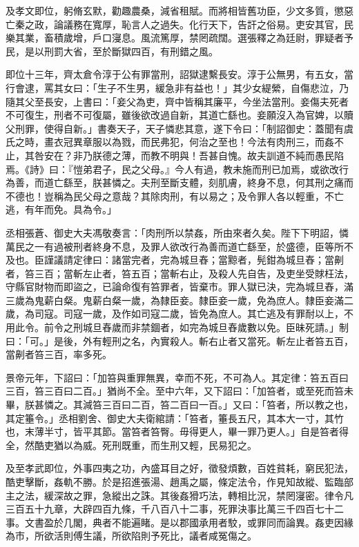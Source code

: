 \begin{pinyinscope}
及孝文即位，躬脩玄默，勸趣農桑，減省租賦。而將相皆舊功臣，少文多質，懲惡亡秦之政，論議務在寬厚，恥言人之過失。化行天下，告訐之俗易。吏安其官，民樂其業，畜積歲增，戶口寖息。風流篤厚，禁罔疏闊。選張釋之為廷尉，罪疑者予民，是以刑罰大省，至於斷獄四百，有刑錯之風。

即位十三年，齊太倉令淳于公有罪當刑，詔獄逮繫長安。淳于公無男，有五女，當行會逮，罵其女曰：「生子不生男，緩急非有益也！」其少女緹縈，自傷悲泣，乃隨其父至長安，上書曰：「妾父為吏，齊中皆稱其廉平，今坐法當刑。妾傷夫死者不可復生，刑者不可復屬，雖後欲改過自新，其道亡繇也。妾願沒入為官婢，以贖父刑罪，使得自新。」書奏天子，天子憐悲其意，遂下令曰：「制詔御史：蓋聞有虞氏之時，畫衣冠異章服以為戮，而民弗犯，何治之至也！今法有肉刑三，而姦不止，其咎安在？非乃朕德之薄，而教不明與！吾甚自愧。故夫訓道不純而愚民陷焉。《詩》曰：『愷弟君子，民之父母。』今人有過，教未施而刑已加焉，或欲改行為善，而道亡繇至，朕甚憐之。夫刑至斷支體，刻肌膚，終身不息，何其刑之痛而不德也！豈稱為民父母之意哉？其除肉刑，有以易之；及令罪人各以輕重，不亡逃，有年而免。具為令。」

丞相張蒼、御史大夫馮敬奏言：「肉刑所以禁姦，所由來者久矣。陛下下明詔，憐萬民之一有過被刑者終身不息，及罪人欲改行為善而道亡繇至，於盛德，臣等所不及也。臣謹議請定律曰：諸當完者，完為城旦舂；當黥者，髡鉗為城旦舂；當劓者，笞三百；當斬左止者，笞五百；當斬右止，及殺人先自告，及吏坐受賕枉法，守縣官財物而即盜之，已論命復有笞罪者，皆棄市。罪人獄已決，完為城旦舂，滿三歲為鬼薪白粲。鬼薪白粲一歲，為隸臣妾。隸臣妾一歲，免為庶人。隸臣妾滿二歲，為司寇。司寇一歲，及作如司寇二歲，皆免為庶人。其亡逃及有罪耐以上，不用此令。前令之刑城旦舂歲而非禁錮者，如完為城旦舂歲數以免。臣昧死請。」制曰：「可。」是後，外有輕刑之名，內實殺人。斬右止者又當死。斬左止者笞五百，當劓者笞三百，率多死。

景帝元年，下詔曰：「加笞與重罪無異，幸而不死，不可為人。其定律：笞五百曰三百，笞三百曰二百。」猶尚不全。至中六年，又下詔曰：「加笞者，或至死而笞未畢，朕甚憐之。其減笞三百曰二百，笞二百曰一百。」又曰：「笞者，所以教之也，其定箠令。」丞相劉舍、御史大夫衛綰請：「笞者，箠長五尺，其本大一寸，其竹也，末薄半寸，皆平其節。當笞者笞臀。毋得更人，畢一罪乃更人。」自是笞者得全，然酷吏猶以為威。死刑既重，而生刑又輕，民易犯之。

及至孝武即位，外事四夷之功，內盛耳目之好，徵發煩數，百姓貧耗，窮民犯法，酷吏擊斷，姦軌不勝。於是招進張湯、趙禹之屬，條定法令，作見知故縱、監臨部主之法，緩深故之罪，急縱出之誅。其後姦猾巧法，轉相比況，禁罔寖密。律令凡三百五十九章，大辟四百九條，千八百八十二事，死罪決事比萬三千四百七十二事。文書盈於几閣，典者不能遍睹。是以郡國承用者駮，或罪同而論異。姦吏因緣為市，所欲活則傅生議，所欲陷則予死比，議者咸冤傷之。


\end{pinyinscope}
